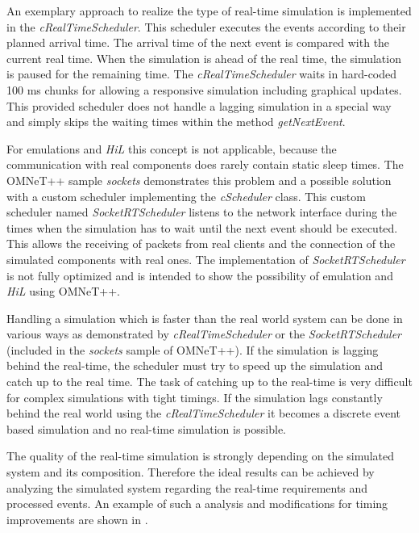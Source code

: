 An exemplary approach to realize the type of real-time simulation is implemented in the \emph{cRealTimeScheduler}.
This scheduler executes the events according to their planned arrival time.
The arrival time of the next event is compared with the current real time.
When the simulation is ahead of the real time, the simulation is paused for the remaining time.
The \emph{cRealTimeScheduler} waits in hard-coded 100 ms chunks for allowing a responsive simulation including graphical updates.
This provided scheduler does not handle a lagging simulation in a special way and simply skips the waiting times within the method \emph{getNextEvent}. \cite[cRealTimeScheduler]{omnet_api}

For emulations and \emph{HiL} this concept is not applicable, because the communication with real components does rarely contain static sleep times.
The OMNeT++ sample \emph{sockets} demonstrates this problem and a possible solution with a custom scheduler implementing the \emph{cScheduler} class.
This custom scheduler named \emph{SocketRTScheduler} listens to the network interface during the times when the simulation has to wait until the next event should be executed.
This allows the receiving of packets from real clients and the connection of the simulated components with real ones.
The implementation of \emph{SocketRTScheduler} is not fully optimized and is intended to show the possibility of emulation and \emph{HiL} using OMNeT++.

Handling a simulation which is faster than the real world system can be done in various ways as demonstrated by \emph{cRealTimeScheduler} or the \emph{SocketRTScheduler} (included in the \emph{sockets} sample of OMNeT++).
If the simulation is lagging behind the real-time, the scheduler must try to speed up the simulation and catch up to the real time.
The task of catching up to the real-time is very difficult for complex simulations with tight timings.
If the simulation lags constantly behind the real world using the \emph{cRealTimeScheduler} it becomes a discrete event based simulation and no real-time simulation is possible.

The quality of the real-time simulation is strongly depending on the simulated system and its composition.
Therefore the ideal results can be achieved by analyzing the simulated system regarding the real-time requirements and processed events.
An example of such a analysis and modifications for timing improvements are shown in \cite{scussel_improvements_2015}.

